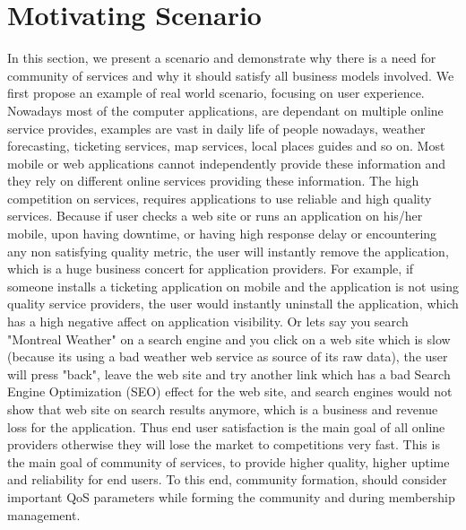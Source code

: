 \section{Motivating Scenario}\label{sec:motexample}

In this section, we present a scenario and demonstrate why there is a need for community of services and why it should satisfy all business models involved.
We first propose an example of real world scenario, focusing on user experience. Nowadays most of the computer applications, are dependant on multiple online
service provides, examples are vast in daily life of people nowadays, weather forecasting, ticketing services, map services, local places guides and so on. Most mobile or web applications
cannot independently provide these information and they rely on different online services providing these information.
The high competition on services, requires applications to use reliable and high quality services.
Because if user checks a web site or runs an application on his/her mobile, upon having downtime, or having high response delay or encountering any non satisfying quality metric, the user
will instantly remove the application, which is a huge business concert for application providers. For example, if someone installs a ticketing application on mobile and the application is not using quality service providers, the user would instantly uninstall the application, which has a high negative affect on application visibility. Or lets say you search "Montreal Weather" on a search engine and you click on a web site which is slow (because its using a bad weather web service as source of its raw data), the user will press "back", leave the web site and try another link which has a bad Search Engine Optimization (SEO) effect for the web site, and search engines would not show that web site on search results anymore, which is a business and revenue loss for the application. Thus end user satisfaction is the main goal of all online providers otherwise they will lose the market to competitions very fast. This is the main goal of community of services, to provide higher quality, higher uptime and reliability for end users. To this end, community formation, should consider important QoS parameters while forming the community and during membership management.


